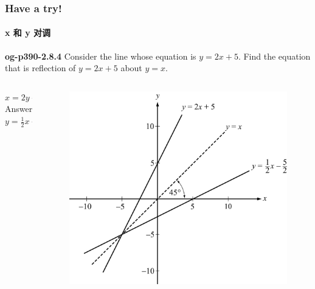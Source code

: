 \documentclass[
	11pt, %
]{beamer}
\begin{document}
\begin{frame}
	\frametitle{Have a try!}
	\framesubtitle{x 和 y 对调}
   \textbf{og-p390-2.8.4} Consider the line whose equation is $y = 2x + 5$. Find the equation that is reflection of $y = 2x + 5$ about $y=x$.
	\begin{columns}[t] 
		\begin{column}{0.4\textwidth} %
		\pause
		$x = 2y + 5$\\
		\bigskip
    Answer \textbf{$y  = \frac{1}{2} x - \frac{5}{2}$}
		\end{column}
		\begin{column}{0.6\textwidth} %
		  \begin{figure}
				\includegraphics[width=\linewidth]{Reflection3.jpg} 
			\end{figure}
    \end{column}
	\end{columns}
\end{frame}

\end{document}
